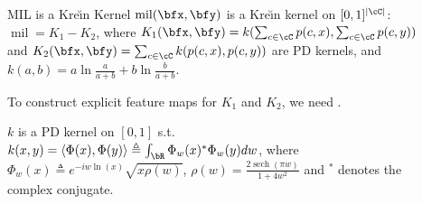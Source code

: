 \documentclass[final]{beamer}
\newcommand{\kr}{Kre\u{\i}n\xspace}
\DeclareMathOperator{\sech}{sech}
\DeclareMathOperator{\mil}{mil}
\newlength{\sepwid}
\newlength{\onecolwid}
\newlength{\threecolwid}
\begin{document}
\begin{frame}[t]
\begin{columns}[t]
\begin{column}{\threecolwid}
\begin{block}{MIL is a \kr Kernel}
 			 $ \mil(\bfx,\bfy) $ is a \kr kernel on 
 			$ 
 			[0,1]^{|\cC|} $: $ \mil=K_1-K_2 $,
 			 where $ 
 			K_1(\bfx,\bfy) = k(\sum_{c\in \cC}p(c,x), \sum_{c\in \cC}p(c,y)) $ 
 			and
 			 $ 
 			K_2(\bfx,\bfy)=\sum_{c\in \cC} k(p(c,x),p(c,y)) $ are PD kernels, 
 			and
 			$
 			k(a,b) = a\ln\frac{a}{a+b}+b\ln\frac{b}{a+b}
 			$.

 		
 		To construct explicit feature maps 
 		for $ K_1 $ and $ K_2 $, we need .
 		
 			 $ k $ is a PD kernel on $ [0,1] $ 
 			s.t.\ 
 			$ k(x,y) = \langle \Phi(x),\Phi(y)\rangle \triangleq \int_\bR \Phi_w(x)^* \Phi_w(y) dw $, 
 			where $
 			\Phi_w(x) \triangleq e^{-iw\ln(x)}
 			\sqrt{x
 			\rho(w)}$, $\rho(w)=\frac{2\sech(\pi 
 			w)}{1+4w^2}$ and $^*$ denotes the complex conjugate.

 		
 		
 		
 		
\end{block}
\end{column} %
\begin{column}{\sepwid}
    
\end{column}
\begin{column}{\onecolwid}
\vspace{-40pt}
    

\end{column}
\end{columns}
\end{frame}
\end{document}
